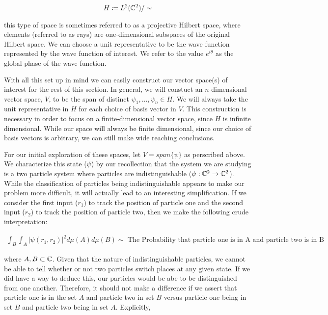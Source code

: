 \begin{equation}
	\begin{aligned}
		H \coloneq L^2(\mathbb{C}^2)/\sim
	\end{aligned}
\end{equation}

this type of space is sometimes referred to as a projective Hilbert space, where elements (referred to as rays) are one-dimensional subspaces of the original Hilbert space. We can choose a unit representative to be the wave function represented by the wave function of interest. We refer to the value $e^{i\theta}$ as the global phase of the wave function.

With all this set up in mind we can easily construct our vector space(s) of interest for the rest of this section. In general, we will constuct an $n$-dimensional vector space, $V$, to be the span of distinct $\psi_1,\hdots,\psi_n\in H$. We will always take the unit representative in $H$ for each choice of basis vector in $V$. This construction is necessary in order to focus on a finite-dimensional vector space, since $H$ is infinite dimensional. While our space will always be finite dimensional, since our choice of basis vectors is arbitrary, we can still make wide reaching conclusions. 

For our initial exploration of these spaces, let $V = span\{\psi\}$ as perscribed above. We characterize this state ($\psi$) by our recollection that the system we are studying is a two particle system where particles are indistinguishable ($\psi:\mathbb{C}^2\rightarrow\mathbb{C}^2$). While the classification of particles being indistinguishable appears to make our problem more difficult, it will actually lead to an interesting simplification. If we consider the first input ($r_1$) to track the position of particle one and the second input ($r_2$) to track the position of particle two, then we make the following crude interpretation:

\begin{small}
\begin{equation}
	\begin{aligned}
		\int_B \int_A |\psi(r_1,r_2)|^2 d\mu(A)d\mu(B) \sim \text{ The Probability that particle one is in A and particle two is in B}
	\end{aligned}
\end{equation}
\end{small}

where $A,B\subset\mathbb{C}$. Given that the nature of indistinguishable particles, we cannot be able to tell whether or not two particles switch places at any given state. If we did have a way to deduce this, our particles would be abe to be distinguished from one another. Therefore, it should not make a difference if we assert that particle one is in the set $A$ and particle two in set $B$ versus particle one being in set $B$ and particle two being in set $A$. Explicitly,

